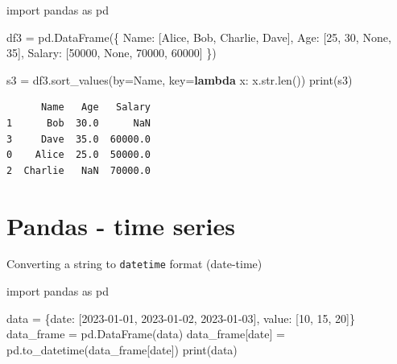 \documentclass[
  english,
  letterpaper,
  DIV=11,
  numbers=noendperiod]{scrreprt}
\newenvironment{Shaded}{\begin{snugshade}}{\end{snugshade}}
\newcommand{\BuiltInTok}[1]{\textcolor[rgb]{0.00,0.23,0.31}{#1}}
\newcommand{\DecValTok}[1]{\textcolor[rgb]{0.68,0.00,0.00}{#1}}
\newcommand{\ImportTok}[1]{\textcolor[rgb]{0.00,0.46,0.62}{#1}}
\newcommand{\KeywordTok}[1]{\textcolor[rgb]{0.00,0.23,0.31}{\textbf{#1}}}
\newcommand{\NormalTok}[1]{\textcolor[rgb]{0.00,0.23,0.31}{#1}}
\newcommand{\OperatorTok}[1]{\textcolor[rgb]{0.37,0.37,0.37}{#1}}
\newcommand{\StringTok}[1]{\textcolor[rgb]{0.13,0.47,0.30}{#1}}
\newcommand{\VariableTok}[1]{\textcolor[rgb]{0.07,0.07,0.07}{#1}}
\begin{document}
\begin{Shaded}
\begin{Highlighting}[]
\ImportTok{import}\NormalTok{ pandas }\ImportTok{as}\NormalTok{ pd}

\NormalTok{df3 }\OperatorTok{=}\NormalTok{ pd.DataFrame(\{}
    \StringTok{\textquotesingle{}Name\textquotesingle{}}\NormalTok{: [}\StringTok{\textquotesingle{}Alice\textquotesingle{}}\NormalTok{, }\StringTok{\textquotesingle{}Bob\textquotesingle{}}\NormalTok{, }\StringTok{\textquotesingle{}Charlie\textquotesingle{}}\NormalTok{, }\StringTok{\textquotesingle{}Dave\textquotesingle{}}\NormalTok{],}
    \StringTok{\textquotesingle{}Age\textquotesingle{}}\NormalTok{: [}\DecValTok{25}\NormalTok{, }\DecValTok{30}\NormalTok{, }\VariableTok{None}\NormalTok{, }\DecValTok{35}\NormalTok{],}
    \StringTok{\textquotesingle{}Salary\textquotesingle{}}\NormalTok{: [}\DecValTok{50000}\NormalTok{, }\VariableTok{None}\NormalTok{, }\DecValTok{70000}\NormalTok{, }\DecValTok{60000}\NormalTok{]}
\NormalTok{\})}

\NormalTok{s3 }\OperatorTok{=}\NormalTok{ df3.sort\_values(by}\OperatorTok{=}\StringTok{\textquotesingle{}Name\textquotesingle{}}\NormalTok{, key}\OperatorTok{=}\KeywordTok{lambda}\NormalTok{ x: x.}\BuiltInTok{str}\NormalTok{.}\BuiltInTok{len}\NormalTok{())}
\BuiltInTok{print}\NormalTok{(s3)}
\end{Highlighting}
\end{Shaded}

\begin{verbatim}
      Name   Age   Salary
1      Bob  30.0      NaN
3     Dave  35.0  60000.0
0    Alice  25.0  50000.0
2  Charlie   NaN  70000.0
\end{verbatim}

\chapter{Pandas - time series}\label{pandas---time-series}

Converting a string to \texttt{datetime} format (date-time)

\begin{Shaded}
\begin{Highlighting}[]
\ImportTok{import}\NormalTok{ pandas }\ImportTok{as}\NormalTok{ pd}

\NormalTok{data }\OperatorTok{=}\NormalTok{ \{}\StringTok{\textquotesingle{}date\textquotesingle{}}\NormalTok{: [}\StringTok{\textquotesingle{}2023{-}01{-}01\textquotesingle{}}\NormalTok{, }\StringTok{\textquotesingle{}2023{-}01{-}02\textquotesingle{}}\NormalTok{, }\StringTok{\textquotesingle{}2023{-}01{-}03\textquotesingle{}}\NormalTok{], }\StringTok{\textquotesingle{}value\textquotesingle{}}\NormalTok{: [}\DecValTok{10}\NormalTok{, }\DecValTok{15}\NormalTok{, }\DecValTok{20}\NormalTok{]\}}
\NormalTok{data\_frame }\OperatorTok{=}\NormalTok{ pd.DataFrame(data)}
\NormalTok{data\_frame[}\StringTok{\textquotesingle{}date\textquotesingle{}}\NormalTok{] }\OperatorTok{=}\NormalTok{ pd.to\_datetime(data\_frame[}\StringTok{\textquotesingle{}date\textquotesingle{}}\NormalTok{])}
\BuiltInTok{print}\NormalTok{(data)}
\end{Highlighting}
\end{Shaded}
\end{document}
